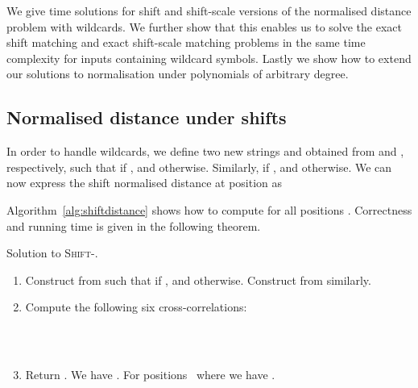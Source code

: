 \documentclass[11pt]{article}
\newcommand{\sLtwoWild}{\textsc{Shift-}\xspace}
\theoremstyle{plain}
\theoremstyle{definition}
\begin{document}
We give  time solutions for shift and shift-scale versions of the normalised  distance problem with wildcards. We further show that this enables us to solve the exact shift matching and exact shift-scale matching problems in the same time complexity for inputs containing wildcard symbols. Lastly we show how to extend our solutions to normalisation under polynomials of arbitrary degree.

\subsection{Normalised  distance under shifts}

In order to handle wildcards, we define two new strings  and  obtained from  and , respectively, such that  if , and  otherwise. Similarly,  if , and  otherwise. We can now express the shift normalised  distance at position  as

Algorithm~\ref{alg:shiftdistance} shows how to compute  for all positions . Correctness and running time is given in the following theorem.


\begin{algorithm}[t]
    \caption{Solution to \sLtwoWild.
    \label{alg:shiftdistance}}
    \begin{enumerate}
        \item Construct  from  such that  if , and  otherwise. Construct  from  similarly.
        \item Compute the following six cross-correlations:

        \begin{tabular}{l}
             \\
            
        \end{tabular}
        \hfill
        \begin{tabular}{l}
             \\
            
        \end{tabular}
        \hfill
        \begin{tabular}{l}
             \\
            
        \end{tabular}

        \item Return . We have . For positions~ where  we have .
    \end{enumerate}
    \vspace{-8pt}
\end{algorithm}
\end{document}
